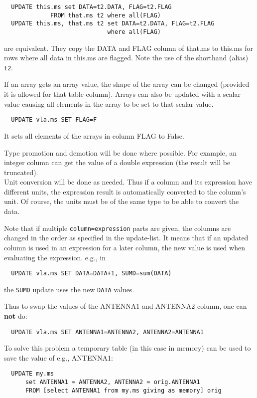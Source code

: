 \begin{verbatim}
  UPDATE this.ms set DATA=t2.DATA, FLAG=t2.FLAG
             FROM that.ms t2 where all(FLAG)
  UPDATE this.ms, that.ms t2 set DATA=t2.DATA, FLAG=t2.FLAG
                             where all(FLAG)
\end{verbatim}
are equivalent. They copy the DATA and FLAG column of that.ms to this.ms for rows where
all data in this.ms are flagged. Note the use of the shorthand (alias) \texttt{t2}.

If an array gets an array value, the shape of the array can be
changed (provided it is allowed for that table column).
Arrays can also be updated with a scalar value causing all elements
in the array to be set to that scalar value.
\begin{verbatim}
  UPDATE vla.ms SET FLAG=F
\end{verbatim}
It sets all elements of the arrays in column FLAG to False.

Type promotion and demotion will be done where possible.
For example, an integer column can get the value of a double
expression (the result will be truncated).
\\Unit conversion will be done as needed. Thus if a column and
its expression have different units, the expression result is automatically
converted to the column's unit. Of course, the units must be of the
same type to be able to convert the data.

Note that if multiple \texttt{column=expression} parts are given,
the columns are changed in the order as specified in the update-list.
It means that if an updated column is used in an expression for
a later column, the new value is used when evaluating the
expression. e.g., in
\begin{verbatim}
  UPDATE vla.ms SET DATA=DATA+1, SUMD=sum(DATA)
\end{verbatim}
the \texttt{SUMD} update uses the new \texttt{DATA} values.

Thus to swap the values of the ANTENNA1 and ANTENNA2 column, one
can {\bf not} do:
\begin{verbatim}
  UPDATE vla.ms SET ANTENNA1=ANTENNA2, ANTENNA2=ANTENNA1
\end{verbatim}
To solve this problem a temporary table (in this case in memory) can
be used to save the value of e.g., ANTENNA1: 
\begin{verbatim}
  UPDATE my.ms
      set ANTENNA1 = ANTENNA2, ANTENNA2 = orig.ANTENNA1
      FROM [select ANTENNA1 from my.ms giving as memory] orig
\end{verbatim}

